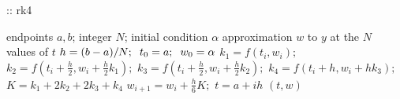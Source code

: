 \documentclass[12pt,oneside]{book}
\begin{document}
\begin{spacing}{1.2}
				\begin{algorithm}[H]
					\caption{:: \ac{rk4}}
					\begin{algorithmic}[1]
						\REQUIRE endpoints $ a, b $; \hspace*{0.2cm} integer $ N $; \hspace*{0.2cm} initial condition $ \alpha $
						\ENSURE approximation $ w $ to $ y $ at the $ N $ values of $ t $
						\STATE $ h = (b - a) / N; \hspace*{0.2cm} t_0 = a; \hspace*{0.2cm} w_{0} = \alpha $
						\STATE $ k_{1} = f(t_{i},w_{i}); $ \hspace*{0.5cm} 
						\STATE $ k_{2} = f\left(t_{i} + \frac{h}{2}, w_{i} + \frac{h}{2}k_{1}\right); $
						\STATE $ k_{3} = f\left(t_{i} + \frac{h}{2}, w_{i} + \frac{h}{2}k_{2}\right); $
						\STATE $ k_{4} = f\left(t_{i} + h, w_{i} + hk_{3}\right); $
						\STATE $ K = k_{1} + 2k_{2} + 2k_{3} + k_{4}  $
						\STATE $ w_{i+1} = w_{i} + \frac{h}{6}K; $ \hspace*{0.5cm} 
						\STATE $ t = a + ih $ \hspace*{0.5cm} 
						\ENDFOR
						\RETURN $ (t, w) $
					\end{algorithmic}
				\end{algorithm}
			
		\end{spacing}
		
		\clearpage
\end{document}
